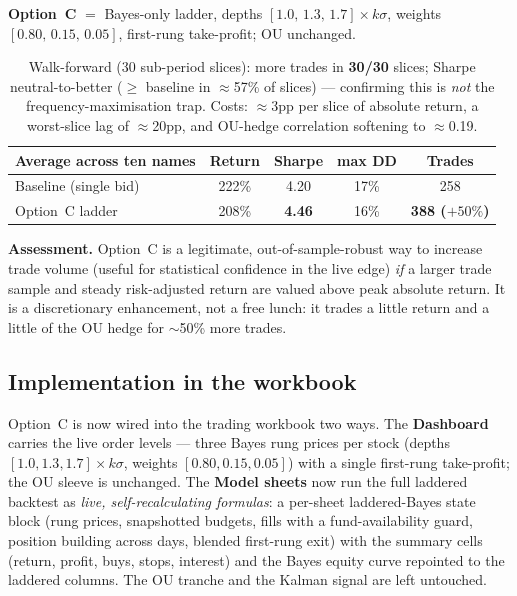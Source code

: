 \documentclass[11pt]{article}
\begin{document}
\textbf{Option~C} $=$ Bayes-only ladder, depths $[1.0,\,1.3,\,1.7]\times k\sigma$, weights
$[0.80,\,0.15,\,0.05]$, first-rung take-profit; OU unchanged.

\begin{table}[h]\centering\small
\renewcommand{\arraystretch}{1.15}
\begin{tabular}{lcccc}
\toprule
\textbf{Average across ten names} & \textbf{Return} & \textbf{Sharpe} & \textbf{max DD} & \textbf{Trades} \\
\midrule
Baseline (single bid) & 222\% & 4.20 & 17\% & 258 \\
Option~C ladder       & 208\% & \textbf{4.46} & 16\% & \textbf{388 ($+50\%$)} \\
\bottomrule
\end{tabular}
\caption*{\footnotesize Walk-forward (30 sub-period slices): more trades in \textbf{30/30}
slices; Sharpe neutral-to-better ($\ge$ baseline in $\approx$57\% of slices) --- confirming
this is \emph{not} the frequency-maximisation trap. Costs: $\approx$3pp per slice of absolute
return, a worst-slice lag of $\approx$20pp, and OU-hedge correlation softening to $\approx$0.19.}
\end{table}

\textbf{Assessment.} Option~C is a legitimate, out-of-sample-robust way to increase trade
volume (useful for statistical confidence in the live edge) \emph{if} a larger trade sample
and steady risk-adjusted return are valued above peak absolute return. It is a discretionary
enhancement, not a free lunch: it trades a little return and a little of the OU hedge for
$\sim$50\% more trades.

\subsection{Implementation in the workbook}

Option~C is now wired into the trading workbook two ways. The \textbf{Dashboard} carries the
live order levels --- three Bayes rung prices per stock (depths $[1.0,1.3,1.7]\times k\sigma$,
weights $[0.80,0.15,0.05]$) with a single first-rung take-profit; the OU sleeve is unchanged.
The \textbf{Model sheets} now run the full laddered backtest as \emph{live, self-recalculating
formulas}: a per-sheet laddered-Bayes state block (rung prices, snapshotted budgets, fills with
a fund-availability guard, position building across days, blended first-rung exit) with the
summary cells (return, profit, buys, stops, interest) and the Bayes equity curve repointed to
the laddered columns. The OU tranche and the Kalman signal are left untouched.
\end{document}
